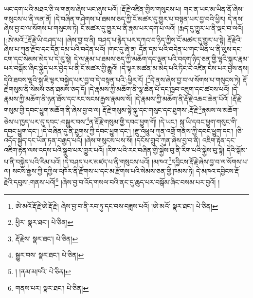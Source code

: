 ཡང་དག་པའི་མཐའ་ཅི་ལ་གནས་ཞེས་ཡང་ཞུས་པའོ། །རྡོ་རྗེ་འཛིན་གྱིས་གསུངས་པ། གང་ན་ཡང་མ་ཡིན་ནོ་ཞེས་གསུངས་པ་ནི་ལན་ནོ། །དེ་བཞིན་གཤེགས་པ་ཐམས་ཅད་ཀྱི་ངོ་མཚར་དུ་གྱུར་པ་བསྟན་པར་བྱ་བའི་ཕྱིར། དེ་ནས་ཞེས་བྱ་བ་ལ་སོགས་པ་གསུངས་ཏེ། ངོ་མཚར་དུ་གྱུར་པ་ནི་རྣམ་པར་དག་པ་ལའོ། །རྨད་དུ་གྱུར་པ་ནི་ལྡང་བ་ལའོ། །:ཨེ་མའོ་\footnote{ཨེ་མའོ་རྡོ་རྗེ་ཨེ་རྡོ་རྗེ། ཞེས་བྱ་བ་ནི་རབ་ཏུ་དང་བས་བཟླས་པའོ། །ཨེ་མའོ་  སྣར་ཐང་།  པེ་ཅིན། }རྡོ་རྗེ་ཡི་བཤད་པ། །ཞེས་བྱ་བ་ནི། བཤད་པ་རྙེད་པར་དཀའ་བ་ཉིད་ཀྱིས་ངོ་མཚར་དུ་གྱུར་པ་སྟེ། རྡོ་རྗེའི་ཞེས་པ་ཀུན་རྫོབ་དང་དོན་དམ་པའི་བདེན་པའོ། །གང་དུ་ཞེ་ན། དོན་དམ་པའི་བདེན་པ་གང་ཡིན་པ་ནི་ལུས་དང་ངག་དང་སེམས་མེད་པ་དེ་རུ་སྟེ། དེ་ལ་རྣམ་པ་ཐམས་ཅད་ཀྱི་མཆོག་དང་ལྡན་པའི་བདག་ཉིད་ཅན་གྱི་ལྷའི་སྐུར་རྣམ་པར་བསྒོམ་ཞིང་སྐྱེད་པར་བྱེད་པ་ནི་ངོ་མཚར་གྱི་རྒྱུའོ། །དེ་ལྟར་མཚན་མ་མེད་པའི་ཏིང་ངེ་འཛིན་ངེས་པར་བྱས་ནས། དེའི་ཐབས་ལྷའི་སྐུ་ཇི་ལྟར་བསྐྱེད་པར་བྱ་བ་དེ་བསྟན་པའི་:ཕྱིར་རོ། །\footnote{ཕྱིར་  སྣར་ཐང་།  པེ་ཅིན། }དེ་ནས་ཞེས་བྱ་བ་ལ་སོགས་པ་གསུངས་ཏེ། རྡོ་རྗེ་གསུམ་ནི་སེམས་ཅན་ཐམས་ཅད་དོ། །དེ་རྣམས་ཀྱི་མཆོག་ནི་ལྷ་ཆེན་པོ་དང་ཁྱབ་འཇུག་དང་ཚངས་པའོ། །དེ་རྣམས་ཀྱི་མཆོག་ནི་ཉན་ཐོས་དང་རང་སངས་རྒྱས་རྣམས་སོ། །དེ་རྣམས་ཀྱི་མཆོག་ནི་རྡོ་རྗེ་འཆང་ཆེན་པོའོ། །རྡོ་རྗེ་གསུམ་གྱི་དབང་ཕྱུག་མཆོག་ནི་ཞེས་བྱ་བ་ལ། རྡོ་རྗེ་གསུམ་སྟེ་སྐུ་དང་གསུང་དང་ཐུགས་:རྡོ་རྗེ་\footnote{རྡོ་རྗེས་  སྣར་ཐང་།  པེ་ཅིན། }རྣམས་ལ་མཆོག་ཅེས་པ་ཁྱད་པར་དུ་དབང་:བསྒྱུར་བས་\footnote{སྒྱུར་བས་  སྣར་ཐང་།  པེ་ཅིན། }ན་རྡོ་རྗེ་གསུམ་གྱི་དབང་ཕྱུག་གོ། །དེ་ཡང་། སྐུ་ཡི་དབང་ཕྱུག་གསུང་གི་དབང་ཕྱུག་དང་། །དེ་བཞིན་དུ་ནི་ཐུགས་ཀྱི་དབང་ཕྱུག་དང་། །རྫུ་འཕྲུལ་ཀུན་འགྲོ་གནས་ཀྱི་དབང་ཕྱུག་དང་། །ཅི་འདོད་སྐྱེད་དང་ཡོན་ཏན་བརྒྱད་པའོ། །ཞེས་གསུངས་པས་སོ། །དངོས་གྲུབ་ཀུན་ཞེས་བྱ་བ་ནི། འཇིག་རྟེན་དང་འཇིག་རྟེན་ལས་འདས་པའི་སྒྲུབ་པར་གྱུར་པའོ། །རིག་པའི་རང་བཞིན་གྱི་སྐྱེས་བུ་ནི་རིག་པའི་སྐྱེས་བུ་སྟེ། དེའི་སྒོམ་པ་ནི་བསྐྱེད་པའི་རིམ་པའོ། །དེ་བཤད་པར་མཛད་པ་ནི་གསུངས་པའོ། །མཁའ་\footnote{། །ནམ་མཁའི་  པེ་ཅིན། }དབྱིངས་རྡོ་རྗེ་ཞེས་བྱ་བ་ལ་སོགས་པ་ལ། སངས་རྒྱས་ཀྱི་དཀྱིལ་འཁོར་ནི་རྫོགས་པ་དང་མ་རྫོགས་པའི་སེམས་ཅན་གྱི་ཁམས་ཏེ། དེ་མཁའ་དབྱིངས་རྡོ་རྗེའི་དབུས་:གནས་པའོ།\footnote{གནས་པར།  སྣར་ཐང་།  པེ་ཅིན། } །ཞེས་བྱ་བ་འོད་གསལ་བའི་ནང་དུ་ཆུད་པར་བསྒོམ་ཞིང་བསམ་པར་བྱའོ། །
